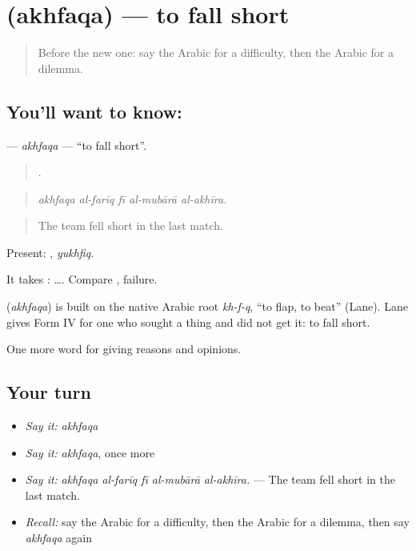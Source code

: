 \section[\texorpdfstring{\ar{أخفق} (akhfaqa)}{أخفق (akhfaqa)}]{ (akhfaqa) — to fall short}

\label{lesson:AR-C372-akhfaqa}



\begin{quote}
Before the new one: say the Arabic for a difficulty, then the Arabic for a dilemma.
\end{quote}

\subsection*{You'll want to know: }
\textbf{} — \emph{akhfaqa} — \textquotedblleft{}to fall short\textquotedblright{}.

\begin{quote}
    .
\end{quote}

\begin{quote}
\emph{akhfaqa al-farīq fī al-mubārā al-akhīra.}
\end{quote}

\begin{quote}
The team fell short in the last match.
\end{quote}

Present: , \emph{yukhfiq}.

It takes :   …. Compare , failure.

\begin{cousinweb}
\textbf{} (\emph{akhfaqa}) is built on the native Arabic root \emph{kh-f-q}, \textquotedblleft{}to flap, to beat\textquotedblright{} (Lane). Lane gives Form IV for one who sought a thing and did not get it: to fall short.
\end{cousinweb}

\begin{grammarlens}[title={What you've built}]
One more word for giving reasons and opinions.
\end{grammarlens}

\subsection*{Your turn}
\begin{itemize}
\raggedright
  \item \emph{Say it:} \emph{akhfaqa}
  \item \emph{Say it:} \emph{akhfaqa}, once more
  \item \emph{Say it:} \emph{akhfaqa al-farīq fī al-mubārā al-akhīra.} — The team fell short in the last match.
  \item \emph{Recall:} say the Arabic for a difficulty, then the Arabic for a dilemma, then say \emph{akhfaqa} again
\end{itemize}

